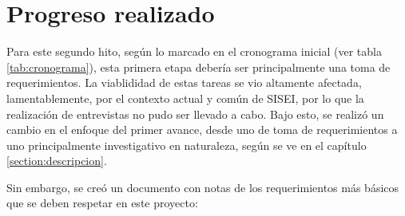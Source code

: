 
\section{Progreso realizado}

Para este segundo hito, según lo marcado en el cronograma inicial (ver tabla \ref{tab:cronograma}), esta primera etapa debería ser principalmente una toma de requerimientos. La viablididad de estas tareas se vio altamente afectada, lamentablemente, por el contexto actual y común de SISEI, por lo que la realización de entrevistas no pudo ser llevado a cabo. Bajo esto, se realizó un cambio en el enfoque del primer avance, desde uno de toma de requerimientos a uno principalmente investigativo en naturaleza, según se ve en el capítulo \ref{section:descripcion}.

Sin embargo, se creó un documento con notas de los requerimientos más básicos que se deben respetar en este proyecto:

